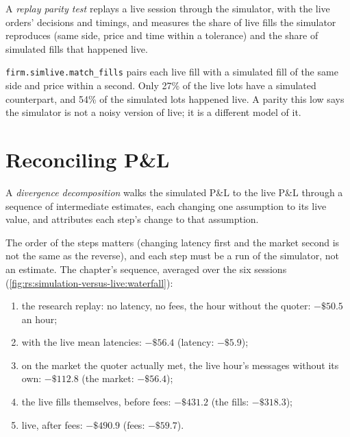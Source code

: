 \begin{definition}\label{def:rs:simulation-versus-live:parity}
A \emph{replay parity test} replays a live session through the simulator, with the live orders' decisions and timings, and measures the
share of live fills the simulator reproduces (same side, price and time within a tolerance) and the share of simulated fills that happened live.
\end{definition}

\texttt{firm.simlive.match\_fills} pairs each live fill with a simulated fill of the same side and price within a second. Only 27\% of the live lots have a simulated
counterpart, and 54\% of the simulated lots happened live. A parity this low says the simulator is not a noisy version of live; it is a different model of it.

\section{Reconciling P\&L}

\begin{definition}\label{def:rs:simulation-versus-live:decomposition}
A \emph{divergence decomposition} walks the simulated P\&L to the live P\&L through a sequence of intermediate estimates, each changing
one assumption to its live value, and attributes each step's change to that assumption.
\end{definition}

The order of the steps matters (changing latency first and the market second is not the same as the reverse), and each step must be a run of the simulator, not an
estimate. The chapter's sequence, averaged over the six sessions (\cref{fig:rs:simulation-versus-live:waterfall}):
\begin{enumerate}
\item the research replay: no latency, no fees, the hour without the quoter: $-\$50.5$ an hour;
\item with the live mean latencies: $-\$56.4$ (latency: $-\$5.9$);
\item on the market the quoter actually met, the live hour's messages without its own: $-\$112.8$ (the market: $-\$56.4$);
\item the live fills themselves, before fees: $-\$431.2$ (the fills: $-\$318.3$);
\item live, after fees: $-\$490.9$ (fees: $-\$59.7$).
\end{enumerate}

